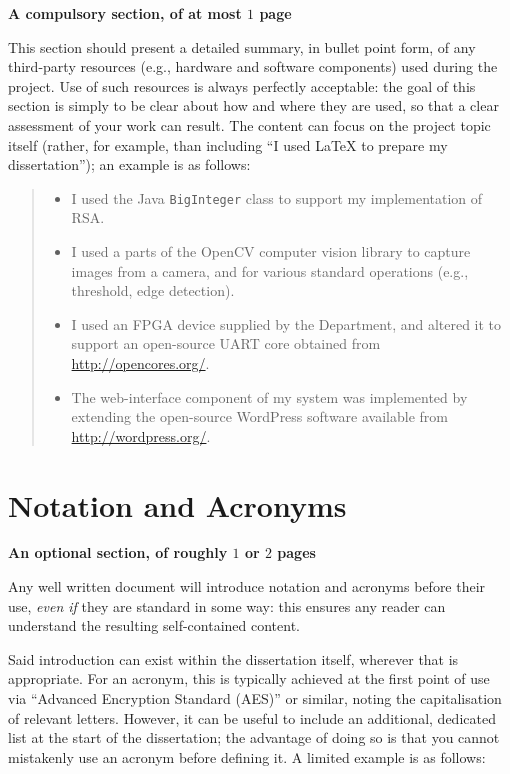 \documentclass[ %
                    author={Tom Jager},
                supervisor={Dr. Daniel Schien},
                    degree={MEng},
                     title={A Bayesian Inference Engine for UMIS Structured Data},
                  subtitle={},
                      type={research},
                      year={2019} ]{dissertation}
\begin{document}
{\bf A compulsory section, of at most $1$ page}
\vspace{1cm} 

\noindent
This section should present a detailed summary, in bullet point form, 
of any third-party resources (e.g., hardware and software components) 
used during the project.  Use of such resources is always perfectly 
acceptable: the goal of this section is simply to be clear about how
and where they are used, so that a clear assessment of your work can
result.  The content can focus on the project topic itself (rather,
for example, than including ``I used \mbox{\LaTeX} to prepare my 
dissertation''); an example is as follows:

\begin{quote}
\noindent
\begin{itemize}
\item I used the Java {\tt BigInteger} class to support my implementation 
      of RSA.
\item I used a parts of the OpenCV computer vision library to capture 
      images from a camera, and for various standard operations (e.g., 
      threshold, edge detection).
\item I used an FPGA device supplied by the Department, and altered it 
      to support an open-source UART core obtained from 
      \url{http://opencores.org/}.
\item The web-interface component of my system was implemented by 
      extending the open-source WordPress software available from
      \url{http://wordpress.org/}.
\end{itemize}
\end{quote}


\chapter*{Notation and Acronyms}

{\bf An optional section, of roughly $1$ or $2$ pages}
\vspace{1cm} 

\noindent
Any well written document will introduce notation and acronyms before
their use, {\em even if} they are standard in some way: this ensures 
any reader can understand the resulting self-contained content.  

Said introduction can exist within the dissertation itself, wherever 
that is appropriate.  For an acronym, this is typically achieved at 
the first point of use via ``Advanced Encryption Standard (AES)'' or 
similar, noting the capitalisation of relevant letters.  However, it 
can be useful to include an additional, dedicated list at the start 
of the dissertation; the advantage of doing so is that you cannot 
mistakenly use an acronym before defining it.  A limited example is 
as follows:
\end{document}
